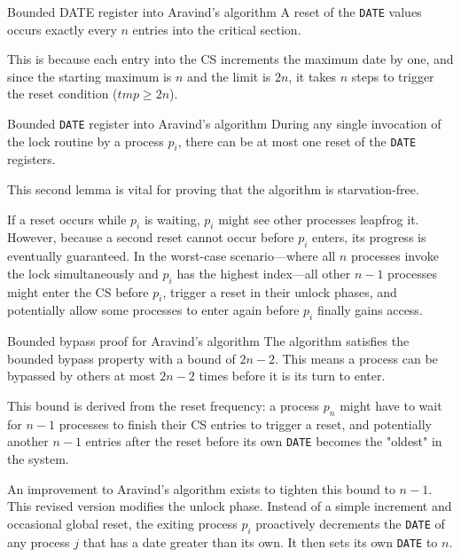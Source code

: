 \begin{Lemma}{Bounded DATE register into Aravind’s algorithm}{}
A reset of the \texttt{DATE} values occurs exactly every $n$ entries into the critical section.
\begin{demonstration}
This is because each entry into the CS increments the maximum date by one, and since the starting maximum is $n$ and the limit is $2n$, it takes $n$ steps to trigger the reset condition ($tmp\geq 2n$).
\end{demonstration}
\end{Lemma}

\begin{Lemma}{Bounded \texttt{DATE} register into Aravind’s algorithm}{}
During any single invocation of the lock routine by a process $p_i$, there can be at most one reset of the \texttt{DATE} registers.

This second lemma is vital for proving that the algorithm is starvation-free.

\begin{demonstration}
    If a reset occurs while $p_i$ is waiting, $p_i$ might see other processes leapfrog it. However, because a second reset cannot occur before $p_i$ enters, its progress is eventually guaranteed. In the worst-case scenario—where all $n$ processes invoke the lock simultaneously and $p_i$ has the highest index—all other $n-1$ processes might enter the CS before $p_i$, trigger a reset in their unlock phases, and potentially allow some processes to enter again before $p_i$ finally gains access.
\end{demonstration}
\end{Lemma}

\begin{Thm}{Bounded bypass proof for Aravind’s algorithm}{}
The algorithm satisfies the bounded bypass property with a bound of $2n-2$. This means a process can be bypassed by others at most $2n-2$ times before it is its turn to enter. 
\begin{demonstration}    
This bound is derived from the reset frequency: a process $p_n$ might have to wait for $n-1$ processes to finish their CS entries to trigger a reset, and potentially another $n-1$ entries after the reset before its own \texttt{DATE} becomes the "oldest" in the system.
\end{demonstration}
\end{Thm}

An improvement to Aravind's algorithm exists to tighten this bound to $n-1$. This revised version modifies the unlock phase. Instead of a simple increment and occasional global reset, the exiting process $p_i$ proactively decrements the \texttt{DATE} of any process $j$ that has a date greater than its own. It then sets its own \texttt{DATE} to $n$.


